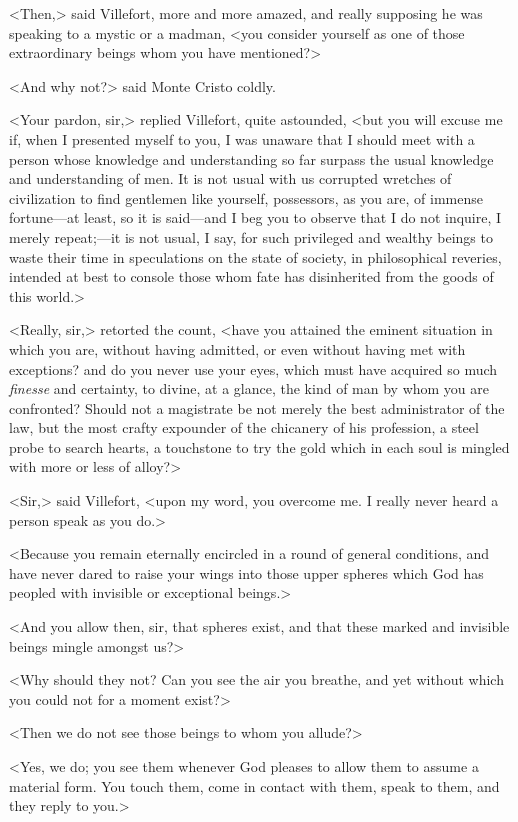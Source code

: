  <Then,> said Villefort, more and more amazed, and really supposing he was speaking to a mystic or a madman, <you consider yourself as one of those extraordinary beings whom you have mentioned?> 

 <And why not?> said Monte Cristo coldly. 

 <Your pardon, sir,> replied Villefort, quite astounded, <but you will excuse me if, when I presented myself to you, I was unaware that I should meet with a person whose knowledge and understanding so far surpass the usual knowledge and understanding of men. It is not usual with us corrupted wretches of civilization to find gentlemen like yourself, possessors, as you are, of immense fortune—at least, so it is said—and I beg you to observe that I do not inquire, I merely repeat;—it is not usual, I say, for such privileged and wealthy beings to waste their time in speculations on the state of society, in philosophical reveries, intended at best to console those whom fate has disinherited from the goods of this world.> 

 <Really, sir,> retorted the count, <have you attained the eminent situation in which you are, without having admitted, or even without having met with exceptions? and do you never use your eyes, which must have acquired so much \textit{finesse} and certainty, to divine, at a glance, the kind of man by whom you are confronted? Should not a magistrate be not merely the best administrator of the law, but the most crafty expounder of the chicanery of his profession, a steel probe to search hearts, a touchstone to try the gold which in each soul is mingled with more or less of alloy?> 

 <Sir,> said Villefort, <upon my word, you overcome me. I really never heard a person speak as you do.> 

 <Because you remain eternally encircled in a round of general conditions, and have never dared to raise your wings into those upper spheres which God has peopled with invisible or exceptional beings.> 

 <And you allow then, sir, that spheres exist, and that these marked and invisible beings mingle amongst us?> 

 <Why should they not? Can you see the air you breathe, and yet without which you could not for a moment exist?> 

 <Then we do not see those beings to whom you allude?> 

 <Yes, we do; you see them whenever God pleases to allow them to assume a material form. You touch them, come in contact with them, speak to them, and they reply to you.> 

